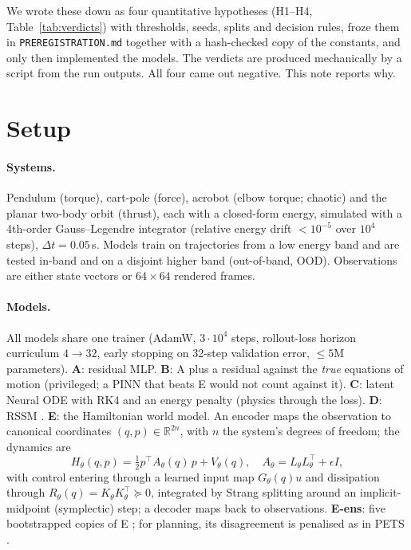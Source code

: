 \documentclass[10pt]{article}
\newcommand{\E}{\textsc{E}}
\begin{document}
We wrote these down as four quantitative hypotheses (H1--H4, Table~\ref{tab:verdicts}) with thresholds,
seeds, splits and decision rules, froze them in \texttt{PREREGISTRATION.md} together with a hash-checked
copy of the constants, and only then implemented the models. The verdicts are produced mechanically by a
script from the run outputs. All four came out negative. This note reports why.

\section{Setup}

\paragraph{Systems.} Pendulum (torque), cart-pole (force), acrobot (elbow torque; chaotic) and the planar
two-body orbit (thrust), each with a closed-form energy, simulated with a 4th-order Gauss--Legendre
integrator \citep{hairer2006gni} (relative energy drift $<10^{-5}$ over $10^4$ steps), $\Delta t = 0.05$\,s.
Models train on trajectories from a low energy band and are tested in-band and on a disjoint higher band
(out-of-band, OOD). Observations are either state vectors or $64\times64$ rendered frames.

\paragraph{Models.} All models share one trainer (AdamW, $3\cdot10^4$ steps, rollout-loss horizon
curriculum $4\to32$, early stopping on 32-step validation error, $\le 5$M parameters).
\textbf{A}: residual MLP. \textbf{B}: A plus a residual against the \emph{true} equations of motion
(privileged; a PINN that beats \E{} would not count against it). \textbf{C}: latent Neural ODE
\citep{chen2018node} with RK4 and an energy penalty (physics through the loss). \textbf{D}: RSSM
\citep{hafner2019planet}. \textbf{\E}: the Hamiltonian world model. An encoder maps the observation to
canonical coordinates $(q,p)\in\mathbb{R}^{2n}$, with $n$ the system's degrees of freedom; the dynamics are
\[
H_\theta(q,p) = \tfrac12 p^\top A_\theta(q)\,p + V_\theta(q),\quad A_\theta = L_\theta L_\theta^\top + \epsilon I,
\]
with control entering through a learned input map $G_\theta(q)u$ and dissipation through
$R_\theta(q)=K_\theta K_\theta^\top\succeq0$, integrated by Strang splitting around an implicit-midpoint
(symplectic) step; a decoder maps back to observations. \textbf{\E-ens}: five bootstrapped copies of \E{}
\citep{lakshminarayanan2017ensembles}; for planning, its disagreement is penalised as in PETS
\citep{chua2018pets}.
\end{document}

